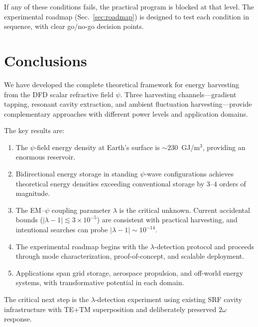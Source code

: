 \documentclass[aps,prd,twocolumn,showpacs,preprintnumbers,superscriptaddress,nofootinbib]{revtex4-2}
\begin{document}
If any of these conditions fails, the practical program is blocked at
that level.  The experimental roadmap (Sec.~\ref{sec:roadmap}) is
designed to test each condition in sequence, with clear go/no-go
decision points.

\section{Conclusions}\label{sec:conclusions}

We have developed the complete theoretical framework for energy
harvesting from the DFD scalar refractive field $\psi$.  Three
harvesting channels---gradient tapping, resonant cavity extraction,
and ambient fluctuation harvesting---provide complementary approaches
with different power levels and application domains.

The key results are:

\begin{enumerate}
\item The $\psi$-field energy density at Earth's surface is
$\sim 230$~GJ/m$^3$, providing an enormous reservoir.

\item Bidirectional energy storage in standing $\psi$-wave configurations
achieves theoretical energy densities exceeding conventional storage by
$3$--$4$ orders of magnitude.

\item The EM--$\psi$ coupling parameter $\lambda$ is the critical
unknown.  Current accidental bounds ($|\lambda-1| \lesssim 3\times 10^{-5}$)
are consistent with practical harvesting, and intentional searches can
probe $|\lambda-1| \sim 10^{-14}$.

\item The experimental roadmap begins with the $\lambda$-detection
protocol and proceeds through mode characterization, proof-of-concept,
and scalable deployment.

\item Applications span grid storage, aerospace propulsion, and
off-world energy systems, with transformative potential in each domain.
\end{enumerate}

The critical next step is the $\lambda$-detection experiment using
existing SRF cavity infrastructure with TE+TM superposition and
deliberately preserved $2\omega$ response.
\end{document}
